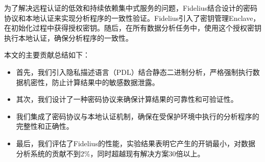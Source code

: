 为了解决远程认证的低效和持续依赖集中式服务的问题，Fidelius结合设计的密码协议和本地认证来实现分析程序的一致性验证。Fidelius引入了密钥管理Enclave，在初始化过程中获得授权密钥。随后，在所有数据分析任务中，使用这个授权密钥执行本地认证，确保分析程序的一致性。

本文的主要贡献总结如下：
\begin{itemize}
    \item 首先，我们引入隐私描述语言（PDL）结合静态二进制分析，严格强制执行数据机密性，防止计算结果中的敏感数据泄露。
    \item 其次，我们设计了一种密码协议来确保计算结果的可靠性和可验证性。
    \item 我们集成了密码协议与本地认证机制，确保在受保护环境中执行的分析程序的完整性和正确性。
    \item 最后，我们评估了Fidelius的性能，实验结果表明它产生的开销最小，对数据分析系统的贡献不到2\%，同时超越现有解决方案30倍以上。
\end{itemize} 